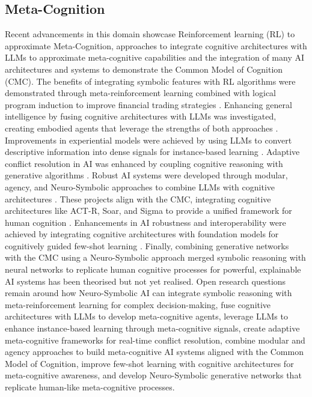 \documentclass[hf]{ceurart}
\begin{document}
\subsection{Meta-Cognition}\label{subsec:disc_meta}
Recent advancements in this domain showcase Reinforcement learning (RL) to approximate Meta-Cognition, approaches to integrate cognitive architectures with LLMs to approximate meta-cognitive capabilities and the integration of many AI architectures and systems to demonstrate the Common Model of Cognition (CMC). The benefits of integrating symbolic features with RL algorithms were demonstrated through meta-reinforcement learning combined with logical program induction to improve financial trading strategies \cite{Harini2023}. Enhancing general intelligence by fusing cognitive architectures with LLMs was investigated, creating embodied agents that leverage the strengths of both approaches \cite{Joshi2024, Liu2024}. Improvements in experiential models were achieved by using LLMs to convert descriptive information into dense signals for instance-based learning \cite{McDonald2024}. Adaptive conflict resolution in AI was enhanced by coupling cognitive reasoning with generative algorithms \cite{Raja2024}. Robust AI systems were developed through modular, agency, and Neuro-Symbolic approaches to combine LLMs with cognitive architectures \cite{Romero2024, Sumers2023}. These projects align with the CMC, integrating cognitive architectures like ACT-R, Soar, and Sigma to provide a unified framework for human cognition \cite{Laird2017}. Enhancements in AI robustness and interoperability were achieved by integrating cognitive architectures with foundation models for cognitively guided few-shot learning \cite{Thomson2024}. Finally, combining generative networks with the CMC using a Neuro-Symbolic approach merged symbolic reasoning with neural networks to replicate human cognitive processes for powerful, explainable AI systems has been theorised but not yet realised\cite{West2024}. Open research questions remain around how Neuro-Symbolic AI can integrate symbolic reasoning with meta-reinforcement learning for complex decision-making, fuse cognitive architectures with LLMs to develop meta-cognitive agents, leverage LLMs to enhance instance-based learning through meta-cognitive signals, create adaptive meta-cognitive frameworks for real-time conflict resolution, combine modular and agency approaches to build meta-cognitive AI systems aligned with the Common Model of Cognition, improve few-shot learning with cognitive architectures for meta-cognitive awareness, and develop Neuro-Symbolic generative networks that replicate human-like meta-cognitive processes.
\end{document}
